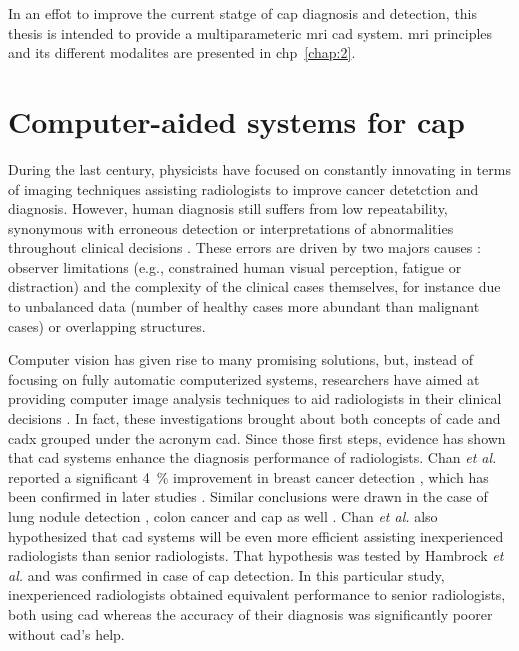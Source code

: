 In an effot to improve the current statge of \ac{cap} diagnosis and detection, this thesis is intended to provide a multiparameteric \ac{mri} \acs{cad} system. 
\ac{mri} principles and its different modalites are presented in \ac{chp}~\ref{chap:2}. 

\section{Computer-aided systems for \ac{cap}}\label{sec:intro:cad} 
During the last century, physicists have focused on constantly innovating in terms of imaging techniques assisting radiologists to improve cancer detetction and diagnosis.
However, human diagnosis still suffers from low repeatability, synonymous with erroneous detection or interpretations of abnormalities throughout clinical decisions \cite{Giger2008,Hambrock2013}.
These errors are driven by two majors causes \cite{Giger2008}: observer limitations (e.g., constrained human visual perception, fatigue or distraction) and the complexity of the clinical cases themselves, for instance due to unbalanced data (number of healthy cases more abundant than malignant cases) or overlapping structures.

Computer vision has given rise to many promising solutions, but, instead of focusing on fully automatic computerized systems, researchers have aimed at providing computer image analysis techniques to aid radiologists in their clinical decisions \cite{Giger2008}.
In fact, these investigations brought about both concepts of \ac{cade} and \ac{cadx} grouped under the acronym \acs{cad}.
Since those first steps, evidence has shown that \acs{cad} systems enhance the diagnosis performance of radiologists.
Chan \textit{et al.} reported a significant 4~\% improvement in breast cancer detection \cite{Chan1999}, which has been confirmed in later studies \cite{Dean2006}.
Similar conclusions were drawn in the case of lung nodule detection \cite{Li2004}, colon cancer \cite{Petrick2008} and \ac{cap} as well \cite{Hambrock2013}.
Chan \textit{et al.} \cite{Chan1999} also hypothesized that \acs{cad} systems will be even more efficient assisting inexperienced radiologists than senior radiologists.
That hypothesis was tested by Hambrock \textit{et al.} \cite{Hambrock2013} and was confirmed in case of \ac{cap} detection.
In this particular study, inexperienced radiologists obtained equivalent performance to senior radiologists, both using \acs{cad} whereas the accuracy of their diagnosis was significantly poorer without \ac{cad}'s help.

